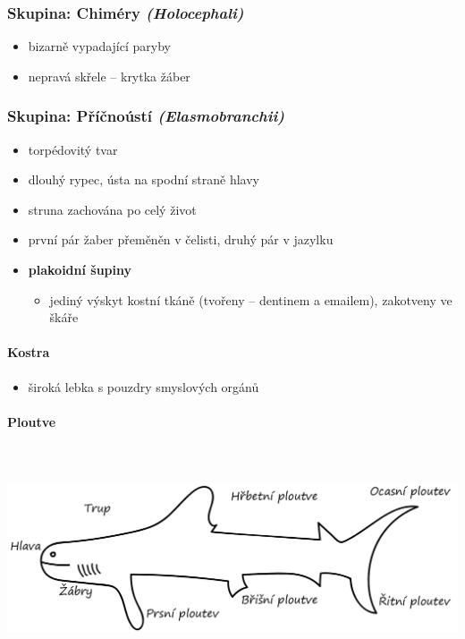 \subsubsection{Skupina: Chiméry \textit{(Holocephali)}}
\begin{itemize}
\item bizarně vypadající paryby
\item nepravá skřele -- krytka žáber
\end{itemize}

\subsubsection{Skupina: Příčnoústí \textit{(Elasmobranchii)}}
\begin{itemize}
\item torpédovitý tvar
\item dlouhý rypec, ústa na spodní straně hlavy
\item struna zachována po celý život
\item první pár žaber přeměněn v čelisti, druhý pár v jazylku
\item \textbf{plakoidní šupiny}
\begin{itemize}
\item jediný výskyt kostní tkáně (tvořeny -- dentinem a emailem), zakotveny ve škáře
\end{itemize}
\end{itemize}

\paragraph{Kostra}
\begin{itemize}
\item široká lebka s pouzdry smyslových orgánů
\end{itemize}

\paragraph{Ploutve}\mbox{} \\ \mbox{} \\
\includegraphics[width=\textwidth]{pictures/ploutve.png}


